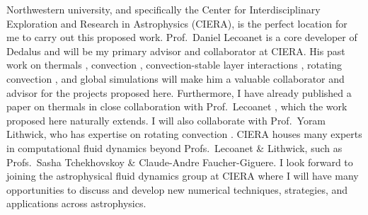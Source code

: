 \documentclass[preprint, hmargin=1in, vmargin=1in]{aastex62}
\begin{document}
Northwestern university, and specifically the Center for Interdisciplinary Exploration and Research in Astrophysics (CIERA), is the perfect location for me to carry out this proposed work.
Prof.~Daniel Lecoanet is a core developer of Dedalus and will be my primary advisor and collaborator at CIERA.
His past work on thermals \citep{lecoanet&jeevanjee2019, tarshish&all2018}, convection \citep{lecoanet&quataert2013, lecoanet&all2014}, convection-stable layer interactions \citep{lecoanet&all2016, couston&all2017}, rotating convection \citep{couston&all2019}, and global simulations \citep{lecoanet&all2019} will make him a valuable collaborator and advisor for the projects proposed here.
Furthermore, I have already published a paper on thermals in close collaboration with Prof.~Lecoanet \citep{andersLB2019}, which the work proposed here naturally extends.
I will also collaborate with Prof.~Yoram Lithwick, who has expertise on rotating convection \citep[e.g.,][]{BDLithwick2014}.
CIERA houses many experts in computational fluid dynamics beyond Profs.~Lecoanet \& Lithwick, such as Profs.~Sasha Tchekhovskoy \& Claude-Andre Faucher-Giguere.
I look forward to joining the astrophysical fluid dynamics group at CIERA where I will have many opportunities to discuss and develop new numerical techniques, strategies, and applications across astrophysics.




\end{document}

